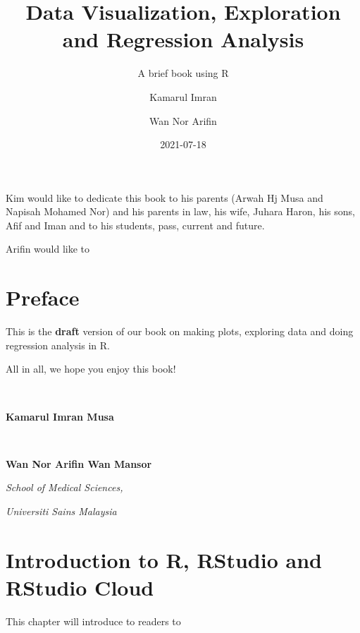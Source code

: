 \documentclass[
]{book}
\title{Data Visualization, Exploration and Regression Analysis}
\subtitle{A brief book using R}
\author{Kamarul Imran \and Wan Nor Arifin}
\date{2021-07-18}
\begin{document}
\maketitle


\thispagestyle{empty}

\begin{center}
Kim would like to dedicate this book to his parents (Arwah Hj Musa and Napisah Mohamed Nor) and his parents in law, his wife, Juhara Haron, his sons, Afif and Iman and to his students, pass, current and future.

Arifin would like to


\end{center}

\setlength{\abovedisplayskip}{-5pt}
\setlength{\abovedisplayshortskip}{-5pt}

{
\hypersetup{linkcolor=}
\setcounter{tocdepth}{2}
\tableofcontents
}
\listoftables
\listoffigures
\hypertarget{preface}{%
\chapter*{Preface}\label{preface}}


This is the \textbf{draft} version of our book on making plots, exploring data and doing regression analysis in R.

All in all, we hope you enjoy this book!

~

\textbf{Kamarul Imran Musa}

~

\textbf{Wan Nor Arifin Wan Mansor}

\emph{School of Medical Sciences,}

\emph{Universiti Sains Malaysia}

\mainmatter

\hypertarget{introduction-to-r-rstudio-and-rstudio-cloud}{%
\chapter{Introduction to R, RStudio and RStudio Cloud}\label{introduction-to-r-rstudio-and-rstudio-cloud}}

This chapter will introduce to readers to
\end{document}
